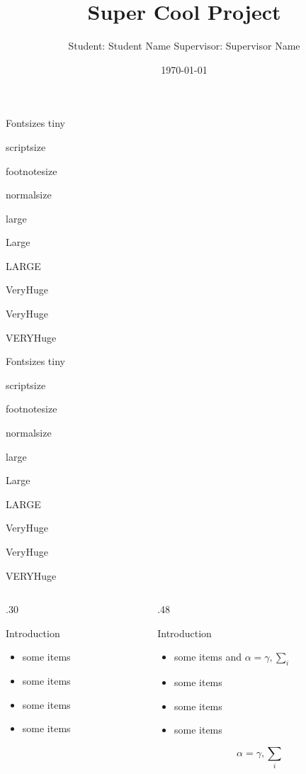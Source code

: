 \documentclass{beamer}
\title[Beamer Poster]{Super Cool Project}
\author{Student: Student Name \hspace{0.75cm} Supervisor: Supervisor Name}
\institute[University of Bristol]{Department of Electrical and Electronics Engineering}
\date{\today}
\begin{document}
  \begin{frame}{}
    \vfill
    \begin{block}{\large Fontsizes}
      \centering
      {\tiny tiny}\par
      {\scriptsize scriptsize}\par
      {\footnotesize footnotesize}\par
      {\normalsize normalsize}\par
      {\large large}\par
      {\Large Large}\par
      {\LARGE LARGE}\par
      {\veryHuge VeryHuge}\par
      {\VeryHuge VeryHuge}\par
      {\VERYHuge VERYHuge}\par
    \end{block}
    \vfill
    \vfill
    \begin{block}{\large Fontsizes}
      \centering
      {\tiny tiny}\par
      {\scriptsize scriptsize}\par
      {\footnotesize footnotesize}\par
      {\normalsize normalsize}\par
      {\large large}\par
      {\Large Large}\par
      {\LARGE LARGE}\par
      {\veryHuge VeryHuge}\par
      {\VeryHuge VeryHuge}\par
      {\VERYHuge VERYHuge}\par
    \end{block}
    \vfill
    \begin{columns}[t]
      \begin{column}{.30\linewidth}
        \begin{block}{Introduction}
          \begin{itemize}
          \item some items
          \item some items
          \item some items
          \item some items
          \end{itemize}
        \end{block}
      \end{column}
      \begin{column}{.48\linewidth}
        \begin{block}{Introduction}
          \begin{itemize}
          \item some items and $\alpha=\gamma, \sum_{i}$
          \item some items
          \item some items
          \item some items
          \end{itemize}
          $$\alpha=\gamma, \sum_{i}$$
        \end{block}


\end{column}
\end{columns}
\end{frame}
\end{document}
